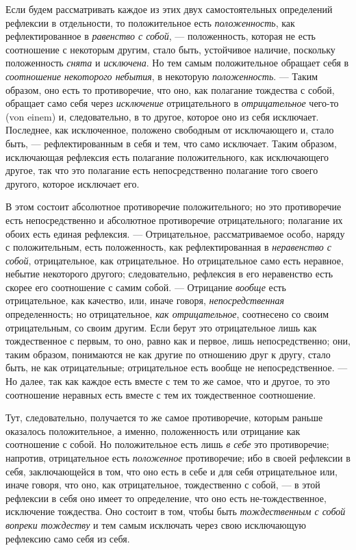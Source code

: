 Если будем рассматривать каждое из этих двух самостоятельных определений
рефлексии в отдельности, то положительное есть
{\em положенность}, как рефлектированное в
{\em равенство с собой}, — положенность, которая не
есть соотношение с некоторым другим, стало быть, устойчивое наличие,
поскольку положенность {\em снята} и
{\em исключена}. Но тем самым положительное обращает
себя в {\em соотношение некоторого небытия}, в
некоторую {\em положенность}. — Таким образом, оно есть
то противоречие, что оно, как полагание тождества с собой, обращает само
себя через {\em исключение} отрицательного в
{\em отрицательное} чего-то (von einem) и,
следовательно, в то другое, которое оно из себя исключает. Последнее, как
исключенное, положено свободным от исключающего и, стало быть, —
рефлектированным в себя и тем, что само исключает. Таким образом,
исключающая рефлексия есть полагание положительного, как исключающего
другое, так что это полагание есть непосредственно полагание того своего
другого, которое исключает его.

В этом состоит абсолютное противоречие положительного; но это противоречие
есть непосредственно и абсолютное противоречие отрицательного; полагание их
обоих есть единая рефлексия. — Отрицательное, рассматриваемое особо, наряду
с положительным, есть положенность, как рефлектированная в
{\em неравенство с собой}, отрицательное, как
отрицательное. Но отрицательное само есть неравное, небытие некоторого
другого; следовательно, рефлексия в его неравенство есть скорее его
соотношение с самим собой. — Отрицание {\em вообще}
есть отрицательное, как качество, или, иначе говоря,
{\em непосредственная} определенность; но
отрицательное, {\em как отрицательное}, соотнесено со
своим отрицательным, со своим другим. Если берут это отрицательное лишь как
тождественное с первым, то оно, равно как и первое, лишь непосредственно;
они, таким образом, понимаются не как другие по отношению друг к другу,
стало быть, не как отрицательные; отрицательное есть вообще не
непосредственное. — Но далее, так как каждое есть вместе с тем то же самое,
что и другое, то это соотношение неравных есть вместе с тем их
тождественное соотношение.

Тут, следовательно, получается то же самое противоречие, которым раньше
оказалось положительное, а именно, положенность или отрицание как
соотношение с собой. Но положительное есть лишь {\em в
себе} это противоречие; напротив, отрицательное есть
{\em положенное} противоречие; ибо в своей рефлексии в
себя, заключающейся в том, что оно есть в себе и для себя отрицательное
или, иначе говоря, что оно, как отрицательное, тождественно с собой, — в
этой рефлексии в себя оно имеет то определение, что оно есть
не-тождественное, исключение тождества. Оно состоит в том, чтобы быть
{\em тождественным с собой вопреки тождеству} и тем
самым исключать через свою исключающую рефлексию само себя из себя.

